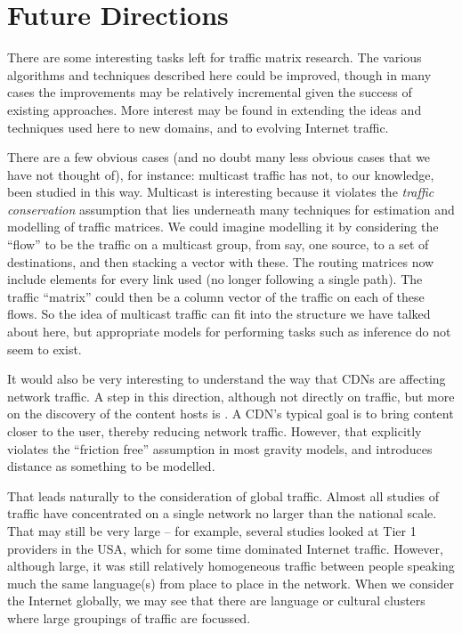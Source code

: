 \clearpage
\section{Future Directions}
\label{sec:future}

There are some interesting tasks left for traffic matrix
research. The various algorithms and techniques described
here could be improved, though in many cases the improvements may be
relatively incremental given the success of existing approaches. More
interest may be found in extending the ideas and techniques used here
to new domains, and to evolving Internet traffic.

There are a few obvious cases (and no doubt many less obvious cases
that we have not thought of), for instance: multicast traffic has not,
to our knowledge, been studied in this way. Multicast is interesting
because it violates the {\em traffic conservation} assumption that
lies underneath many techniques for estimation and modelling of
traffic matrices. We could imagine modelling it by considering the
``flow'' to be the traffic on a multicast group, from say, one source,
to a set of destinations, and then stacking a vector with these. The
routing matrices now include elements for every link used (no longer
following a single path). The traffic ``matrix'' could then be a
column vector of the traffic on each of these flows. So the idea of
multicast traffic can fit into the structure we have talked about
here, but appropriate models for performing tasks such as inference
do not seem to exist.

It would also be very interesting to understand the way that CDNs are
affecting network traffic. A step in this direction, although not directly
on traffic, but more on the discovery of the content hosts is \cite{Ager11CDN}.
A CDN's typical goal is to bring content
closer to the user, thereby reducing network traffic. However, that
explicitly violates the ``friction free'' assumption in most gravity
models, and introduces distance as something to be modelled.

That leads naturally to the consideration of global traffic. Almost all
studies of traffic have concentrated on a single network no larger
than the national scale. That may still be very large -- for example,
several studies looked at Tier 1 providers in the USA, which for some
time dominated Internet traffic. However, although large, it was still
relatively homogeneous traffic between people speaking much the same
language(s) from place to place in the network. When we consider the
Internet globally, we may see that there are language or cultural
clusters where large groupings of traffic are focussed.

